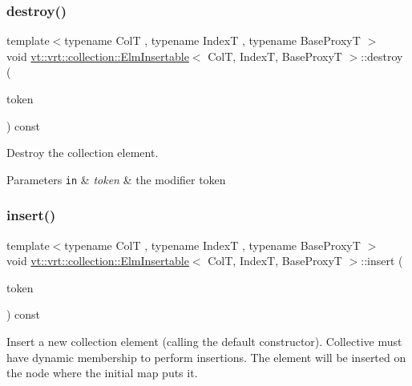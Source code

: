 \subsubsection{\texorpdfstring{destroy()}{destroy()}}
{\footnotesize\ttfamily template$<$typename ColT , typename IndexT , typename Base\+ProxyT $>$ \\
void \hyperlink{structvt_1_1vrt_1_1collection_1_1_elm_insertable}{vt\+::vrt\+::collection\+::\+Elm\+Insertable}$<$ ColT, IndexT, Base\+ProxyT $>$\+::destroy (\begin{DoxyParamCaption}\item[{\hyperlink{structvt_1_1vrt_1_1collection_1_1_modifier_token}{Modifier\+Token} \&}]{token }\end{DoxyParamCaption}) const}



Destroy the collection element. 


\begin{DoxyParams}[1]{Parameters}
\mbox{\tt in}  & {\em token} & the modifier token \\
\hline
\end{DoxyParams}
\mbox{\label{structvt_1_1vrt_1_1collection_1_1_elm_insertable_a194756166f6728c3992f08b1bbf72ee1}} 
\subsubsection{\texorpdfstring{insert()}{insert()}}
{\footnotesize\ttfamily template$<$typename ColT , typename IndexT , typename Base\+ProxyT $>$ \\
void \hyperlink{structvt_1_1vrt_1_1collection_1_1_elm_insertable}{vt\+::vrt\+::collection\+::\+Elm\+Insertable}$<$ ColT, IndexT, Base\+ProxyT $>$\+::insert (\begin{DoxyParamCaption}\item[{\hyperlink{structvt_1_1vrt_1_1collection_1_1_modifier_token}{Modifier\+Token} \&}]{token }\end{DoxyParamCaption}) const}



Insert a new collection element (calling the default constructor). Collective must have dynamic membership to perform insertions. The element will be inserted on the node where the initial map puts it. 


